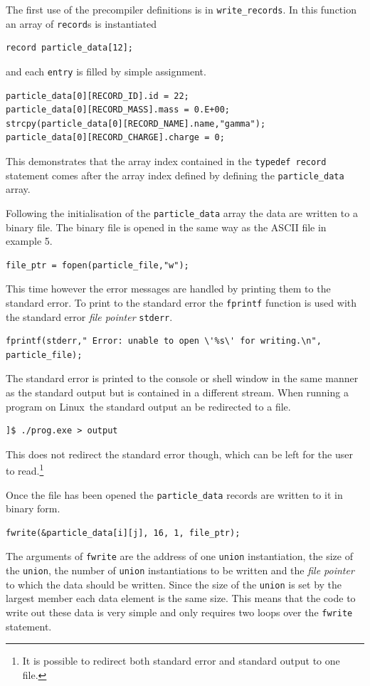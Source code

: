 \documentclass[11pt]{scrartcl}
\def\linux{Linux}
\begin{document}
The first use of the precompiler definitions is in
\texttt{write\_records}.  In this function an array of \texttt{record}s is
instantiated
\begin{lstlisting}
record particle_data[12];
\end{lstlisting}
and each \texttt{entry} is filled by simple assignment.
\begin{lstlisting}
particle_data[0][RECORD_ID].id = 22;
particle_data[0][RECORD_MASS].mass = 0.E+00;
strcpy(particle_data[0][RECORD_NAME].name,"gamma");
particle_data[0][RECORD_CHARGE].charge = 0;
\end{lstlisting}
This demonstrates that the array index contained in the
\texttt{typedef}~\texttt{record} statement comes after the array index
defined by defining the \texttt{particle\_data} array.

Following the initialisation of the \texttt{particle\_data} array the
data are written to a binary file.  The binary file is opened in the
same way as the ASCII file in example 5.
\begin{lstlisting}
file_ptr = fopen(particle_file,"w");
\end{lstlisting}
This time however the error messages are handled by printing them to
the standard error.  To print to the standard error the
\texttt{fprintf} function is used with the standard error {\em file
pointer} \texttt{stderr}.
\begin{lstlisting}
fprintf(stderr," Error: unable to open \'%s\' for writing.\n", particle_file);
\end{lstlisting}
The standard error is printed to the console or shell window in the
same manner as the standard output but is contained in a different
stream.  When running a program on \linux\ the standard output an be redirected to a file.
\begin{verbatim}
]$ ./prog.exe > output
\end{verbatim} %
This does not redirect the standard error though, which can be left
for the user to read.\footnote{It is possible to redirect both
standard error and standard output to one file.}

Once the file has been opened the \texttt{particle\_data} records are written to it in binary form.
\begin{lstlisting}
fwrite(&particle_data[i][j], 16, 1, file_ptr);
\end{lstlisting}
The arguments of \texttt{fwrite} are the address of one \texttt{union}
instantiation, the size of the \texttt{union}, the number of
\texttt{union} instantiations to be written and the {\em file pointer} to which the data should be written.  Since the size of the \texttt{union} is set by the largest member each data element is the same size.  This means that the code to write out these data is very simple and only requires two loops over the \texttt{fwrite} statement.  
\end{document}
